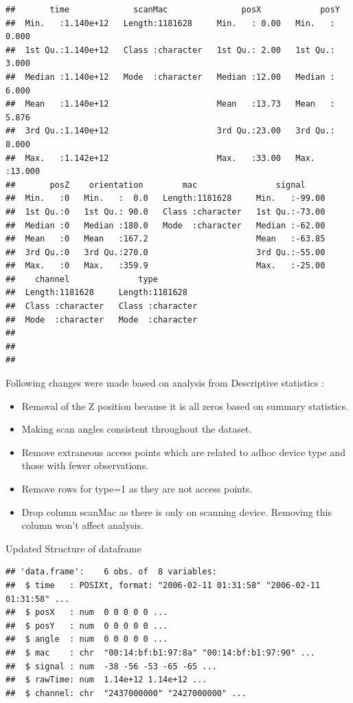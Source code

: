 \documentclass[
]{article}
\providecommand{\tightlist}{%
  \setlength{\itemsep}{0pt}\setlength{\parskip}{0pt}}
\begin{document}
\begin{verbatim}
##       time             scanMac               posX            posY       
##  Min.   :1.140e+12   Length:1181628     Min.   : 0.00   Min.   : 0.000  
##  1st Qu.:1.140e+12   Class :character   1st Qu.: 2.00   1st Qu.: 3.000  
##  Median :1.140e+12   Mode  :character   Median :12.00   Median : 6.000  
##  Mean   :1.140e+12                      Mean   :13.73   Mean   : 5.876  
##  3rd Qu.:1.140e+12                      3rd Qu.:23.00   3rd Qu.: 8.000  
##  Max.   :1.142e+12                      Max.   :33.00   Max.   :13.000  
##       posZ    orientation        mac                signal      
##  Min.   :0   Min.   :  0.0   Length:1181628     Min.   :-99.00  
##  1st Qu.:0   1st Qu.: 90.0   Class :character   1st Qu.:-73.00  
##  Median :0   Median :180.0   Mode  :character   Median :-62.00  
##  Mean   :0   Mean   :167.2                      Mean   :-63.85  
##  3rd Qu.:0   3rd Qu.:270.0                      3rd Qu.:-55.00  
##  Max.   :0   Max.   :359.9                      Max.   :-25.00  
##    channel              type          
##  Length:1181628     Length:1181628    
##  Class :character   Class :character  
##  Mode  :character   Mode  :character  
##                                       
##                                       
## 
\end{verbatim}

Following changes were made based on analysis from Descriptive
statistics :

\begin{itemize}
\tightlist
\item
  Removal of the Z position because it is all zeros based on summary
  statistics.
\item
  Making scan angles consistent throughout the dataset.
\item
  Remove extraneous access points which are related to adhoc device type
  and those with fewer observations.
\item
  Remove rows for type=1 as they are not access points.
\item
  Drop column scanMac as there is only on scanning device. Removing this
  column won't affect analysis.
\end{itemize}

Updated Structure of dataframe

\begin{verbatim}
## 'data.frame':    6 obs. of  8 variables:
##  $ time   : POSIXt, format: "2006-02-11 01:31:58" "2006-02-11 01:31:58" ...
##  $ posX   : num  0 0 0 0 0 ...
##  $ posY   : num  0 0 0 0 0 ...
##  $ angle  : num  0 0 0 0 0 ...
##  $ mac    : chr  "00:14:bf:b1:97:8a" "00:14:bf:b1:97:90" ...
##  $ signal : num  -38 -56 -53 -65 -65 ...
##  $ rawTime: num  1.14e+12 1.14e+12 ...
##  $ channel: chr  "2437000000" "2427000000" ...
\end{verbatim}
\end{document}
